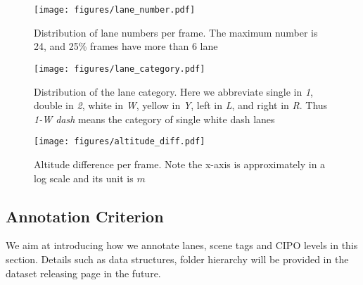 \documentclass[runningheads]{llncs}
\begin{document}
\begin{figure}[t!]
    \centering
\texttt{[image: figures/lane\_number.pdf]}
\vspace{-.2cm}
      \caption{Distribution of lane numbers per frame. The maximum number is 24, and 25\% frames have more than 6 lane}
    \label{fig: stat - number}
\end{figure}

\begin{figure}[t!]
    \centering
\texttt{[image: figures/lane\_category.pdf]}
\vspace{-.2cm}
      \caption{Distribution of the lane category. Here we abbreviate single in \textit{1}, double in \textit{2}, white in \textit{W}, yellow in \textit{Y}, left in \textit{L}, and right in \textit{R}. Thus \textit{1-W dash} means the category of single white dash lanes}
    \label{fig: stat - type}
\end{figure}

\begin{figure}[t!]
    \centering
\texttt{[image: figures/altitude\_diff.pdf]}
\vspace{-.2cm}
      \caption{Altitude difference per frame. Note the x-axis is approximately in a log scale and its unit is $m$}
    \label{fig: stat - height}
\end{figure}


\subsection{Annotation Criterion}

We aim at introducing how we annotate lanes, scene tags and CIPO levels in this section. Details such as data structures, folder hierarchy will be provided in the dataset releasing page in the future.
\end{document}
